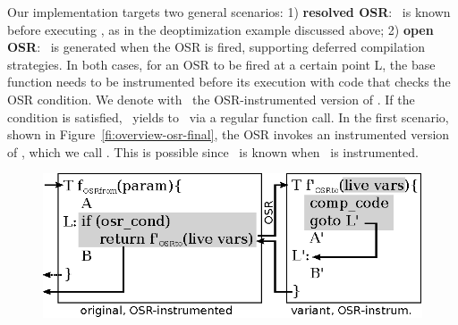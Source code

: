 Our implementation targets two general scenarios: 1) {\bf resolved OSR}: \fvariant\ is known before executing \fbase, as in the deoptimization example discussed above; 2) {\bf open OSR}: \fvariant\ is generated when the OSR is fired, supporting deferred compilation strategies. In both cases, for an OSR to be fired at a certain point \textsf{L}, the base function needs to be instrumented before its execution with code that checks the OSR condition. We denote with \fosrfrom\ the OSR-instrumented version of \fbase. If the condition is satisfied, \fosrfrom\ yields to \fvariant\ via a regular function call. In the first scenario, shown in Figure~\ref{fi:overview-osr-final}, the OSR invokes an instrumented version of \fvariant, which we call \fosrto. This is possible since \fvariant\ is known when \fbase\ is instrumented.



%
%

\ifdefined\noauthorea
\begin{figure}[t]
\begin{center}
\includegraphics[width=0.7\columnwidth]{figures/overview-osr-final/overview-osr-final.eps}
\caption{\protect}
\end{center}
\end{figure}
\fi

